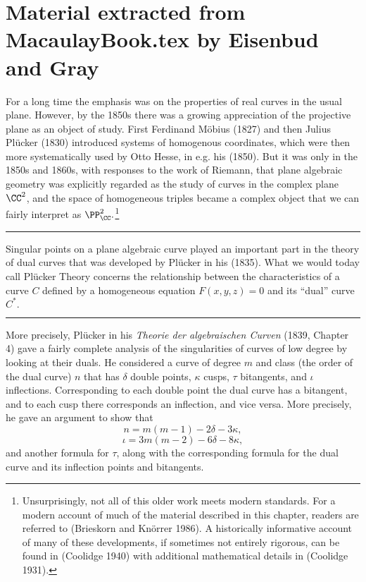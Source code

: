  
 
 \chapter{Material extracted from MacaulayBook.tex by Eisenbud and Gray}
 
 For a long time the emphasis was on the properties of real curves in the usual plane. However, by the 1850s there was a growing appreciation of the projective plane as an object of study. First Ferdinand M\"obius (1827) and then Julius Pl\"ucker (1830) introduced systems of homogenous coordinates, which were then more systematically used by Otto Hesse, in e.g. his (1850). But it was only in the 1850s and 1860s, with responses to the work of Riemann, that plane algebraic geometry was explicitly  regarded as  the study of curves in the complex plane $\CC^2$, and the space of homogeneous triples  became a complex object that we can fairly interpret as $\PP_{\CC}^2.$\footnote{Unsurprisingly, not all of this older work meets modern standards. For a modern account of  much of the material described in this chapter, readers are referred to (Brieskorn and Kn\"orrer 1986). A historically informative account of many of these developments, if sometimes not entirely rigorous, can be found in (Coolidge 1940) with additional mathematical details in (Coolidge 1931).}

\bigbreak\hrule\bigbreak

Singular points on a plane algebraic curve played an important part in the theory of dual curves that was developed by Pl\"ucker  in his (1835). 
What we would today call Pl\"ucker Theory concerns the relationship between the characteristics of a curve $C$ defined by a homogeneous equation $F(x,y,z) = 0$ and its 
``dual'' curve $C^{*}.$

\bigbreak\hrule\bigbreak

More precisely, Pl\"ucker in his \emph{Theorie der algebraischen Curven} (1839, Chapter 4) gave a fairly complete analysis of the singularities of curves of low degree by looking at their duals. He considered a curve of degree $m$ and class (the order of the dual curve) $n$ that has $\delta$ double points, $\kappa$ cusps, $\tau$ bitangents, and $\iota$ inflections. Corresponding to each double point the dual curve has a bitangent, and to each cusp there corresponds an inflection, and vice versa. More precisely, he gave an argument to show that
\[n = m(m-1) - 2\delta - 3 \kappa,\]
\[\iota = 3m(m-2) - 6\delta - 8\kappa,\]
and another formula for $\tau$, along with the corresponding formula for the dual curve and its inflection points and bitangents.

